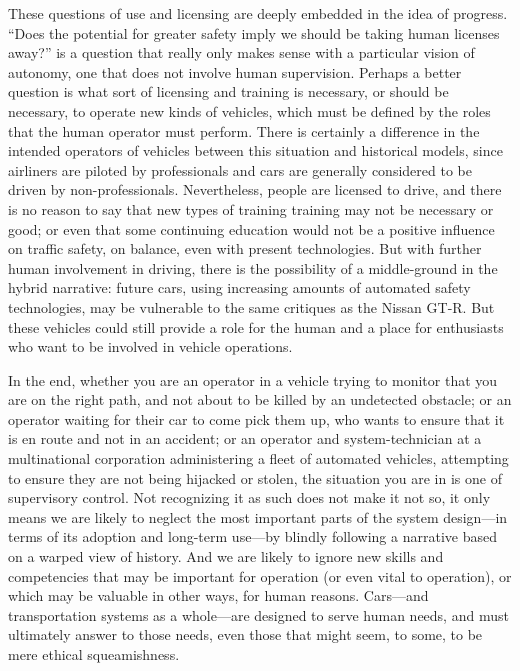 These questions of use and licensing are deeply embedded in the idea
of progress. ``Does the potential for greater safety imply we should be
taking human licenses away?'' is a question that really only makes
sense with a particular vision of autonomy, one that does not involve
human supervision. Perhaps a better question is what sort of licensing
and training is necessary, or should be necessary, to operate new
kinds of vehicles, which must be defined by the roles that the human
operator must perform. There is certainly a difference in the intended
operators of vehicles between this situation and historical models,
since airliners are piloted by professionals
and cars are generally considered to be driven by non-professionals.
Nevertheless, people are licensed to drive, and there is no reason to
say that new types of training training may not be necessary or good;
or even that some continuing education would not be a positive
influence on traffic safety, on balance, even with present
technologies. But with further human involvement in driving, there is
the possibility of a
middle-ground in the hybrid narrative:  future cars, using increasing
amounts of automated safety technologies,
may be vulnerable to the same critiques as the Nissan GT-R. But these
vehicles could still provide a role for the human and a place for
enthusiasts who want to be involved in vehicle operations.

In the end, whether you are an operator in a vehicle trying to monitor that you
are on the right path, and not about to be killed by an undetected
obstacle; or an operator waiting
for their car to come pick them up, who wants to ensure that it is en route
and not in an accident; or an operator and system-technician at a
multinational corporation administering a fleet of automated vehicles,
attempting to ensure they are not being 
hijacked or stolen, the situation you are in is one of supervisory
control. Not recognizing it as such does not make it not so, it only means we are
likely to neglect the most important parts of the system design---in
terms of its adoption and long-term use---by blindly following a
narrative based on a warped view of history. And we are likely to
ignore new skills and competencies that may be important for
operation (or even vital to operation), or which may be valuable in other ways, for
human reasons. Cars---and transportation systems as a whole---are
designed to serve human needs, and must ultimately answer to those
needs, even those that might seem, to some, to be mere ethical squeamishness.


